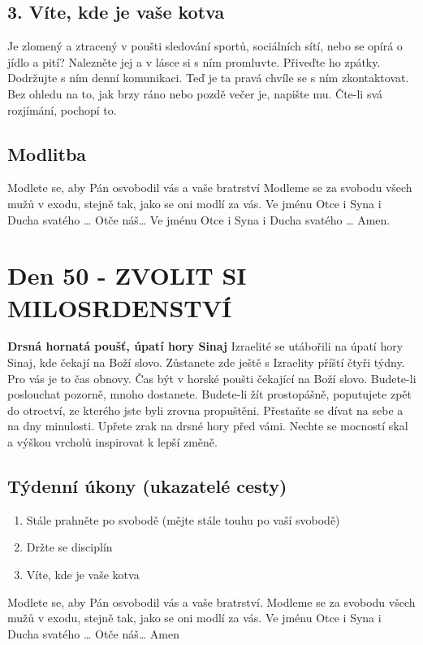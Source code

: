 \documentclass[11pt]{article}
\newcommand{\zacatekOsmyTyden}{
  \textbf{Drsná hornatá poušť, úpatí hory Sinaj} \newline 
  Izraelité se utábořili na úpatí hory Sinaj, kde čekají na Boží slovo. Zůstanete zde ještě s Izraelity příští čtyři týdny. Pro vás je to čas obnovy. Čas být v horské poušti čekající na Boží slovo. Budete-li poslouchat pozorně, mnoho dostanete. Budete-li žít prostopášně, poputujete zpět do otroctví, ze kterého jste byli zrovna propuštěni. Přestaňte se dívat na sebe a na dny minulosti. Upřete zrak na drsné hory před vámi. Nechte se mocností skal a výškou vrcholů inspirovat k lepší změně.
  \subsection*{Týdenní úkony (ukazatelé cesty)}
\begin{enumerate}
  \item Stále prahněte po svobodě (mějte stále touhu po vaší svobodě)
  \item Držte se disciplín
  \item Víte, kde je vaše kotva
\end{enumerate}
Modlete se, aby Pán osvobodil vás a vaše bratrství. \newline
Modleme se za svobodu všech mužů v exodu, stejně tak, jako se oni modlí za vás.\newline
Ve jménu Otce i Syna i Ducha svatého …  Otče náš… Amen
}
\begin{document}
\subsection*{3. Víte, kde je vaše kotva}
Je zlomený a ztracený v poušti sledování sportů, sociálních sítí, nebo se opírá o jídlo a pití? Nalezněte jej a v lásce si s ním promluvte. Přiveďte ho zpátky. Dodržujte s ním denní komunikaci. Teď je ta pravá chvíle se s ním zkontaktovat. Bez ohledu na to, jak brzy ráno nebo pozdě večer je, napište mu. Čte-li svá rozjímání, pochopí to.

\subsection*{Modlitba}
Modlete se, aby Pán osvobodil vás a vaše bratrství \newline
Modleme se za svobodu všech mužů v exodu, stejně tak, jako se oni modlí za vás.\newline
Ve jménu Otce i Syna i Ducha svatého … Otče náš… Ve jménu Otce i Syna i Ducha svatého … Amen.
\newpage


\newpage
\section{Den 50 - ZVOLIT SI MILOSRDENSTVÍ }
\zacatekOsmyTyden
\end{document}
